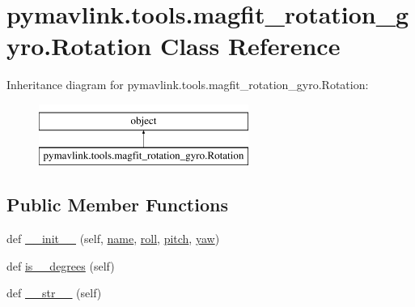 \hypertarget{classpymavlink_1_1tools_1_1magfit__rotation__gyro_1_1Rotation}{}\section{pymavlink.\+tools.\+magfit\+\_\+rotation\+\_\+gyro.\+Rotation Class Reference}
\label{classpymavlink_1_1tools_1_1magfit__rotation__gyro_1_1Rotation}
Inheritance diagram for pymavlink.\+tools.\+magfit\+\_\+rotation\+\_\+gyro.\+Rotation\+:\begin{figure}[H]
\begin{center}
\leavevmode
\includegraphics[height=2.000000cm]{classpymavlink_1_1tools_1_1magfit__rotation__gyro_1_1Rotation}
\end{center}
\end{figure}
\subsection*{Public Member Functions}
\begin{DoxyCompactItemize}
\item 
def \mbox{\hyperlink{classpymavlink_1_1tools_1_1magfit__rotation__gyro_1_1Rotation_accac6f6ca7fb0d96a8e61d64e4e180a7}{\+\_\+\+\_\+init\+\_\+\+\_\+}} (self, \mbox{\hyperlink{classpymavlink_1_1tools_1_1magfit__rotation__gyro_1_1Rotation_a35ff5b76a58e457f04b53806305a78b8}{name}}, \mbox{\hyperlink{classpymavlink_1_1tools_1_1magfit__rotation__gyro_1_1Rotation_a87366b9bb41c2b076b1bbe7a4fefb3c7}{roll}}, \mbox{\hyperlink{classpymavlink_1_1tools_1_1magfit__rotation__gyro_1_1Rotation_a8d07ae7ab64afb5cada12087248ec304}{pitch}}, \mbox{\hyperlink{classpymavlink_1_1tools_1_1magfit__rotation__gyro_1_1Rotation_a042cd272704a4136a52a3889f9e77266}{yaw}})
\item 
def \mbox{\hyperlink{classpymavlink_1_1tools_1_1magfit__rotation__gyro_1_1Rotation_a388b13ac359df1c516f995babbc28f0d}{is\+\_\+\_\+degrees}} (self)
\item 
def \mbox{\hyperlink{classpymavlink_1_1tools_1_1magfit__rotation__gyro_1_1Rotation_af3301ae970af4c603fd959eeefc9e53d}{\+\_\+\+\_\+str\+\_\+\+\_\+}} (self)
\end{DoxyCompactItemize}
